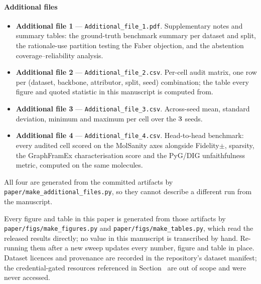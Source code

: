\paragraph{Additional files}
\begin{itemize}\itemsep2pt
\item \textbf{Additional file 1} --- \texttt{Additional\_file\_1.pdf}.
  Supplementary notes and summary tables: the ground-truth benchmark summary
  per dataset and split, the rationale-use partition testing the Faber
  objection, and the abstention coverage--reliability analysis.
\item \textbf{Additional file 2} --- \texttt{Additional\_file\_2.csv}.
  Per-cell audit matrix, one row per (dataset, backbone, attributor, split,
  seed) combination; the table every figure and quoted statistic in this
  manuscript is computed from.
\item \textbf{Additional file 3} --- \texttt{Additional\_file\_3.csv}.
  Across-seed mean, standard deviation, minimum and maximum per cell over the
  $3{}$ seeds.
\item \textbf{Additional file 4} --- \texttt{Additional\_file\_4.csv}.
  Head-to-head benchmark: every audited cell scored on the MolSanity axes
  alongside Fidelity$\pm$, sparsity, the GraphFramEx characterisation score and
  the PyG/DIG unfaithfulness metric, computed on the same molecules.
\end{itemize}
All four are generated from the committed artifacts by
\texttt{paper/make\_\-additional\_\-files.py}, so they cannot describe a
different run from the manuscript.

Every figure and table in this paper is generated from those artifacts by
\texttt{paper/figs/make\_\-figures.py} and
\texttt{paper/figs/make\_\-tables.py}, which read the released results
directly; no value in this manuscript is transcribed by hand. Re-running them
after a new sweep updates every number, figure and table in place. Dataset
licences and provenance are recorded in the repository's dataset manifest; the
credential-gated resources referenced in Section~ are out of
scope and were never accessed.

